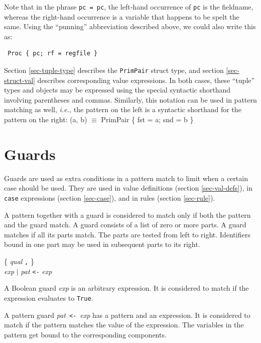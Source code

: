 \documentclass[twoside,letterpaper]{article}
\newcommand{\hm}{\hspace*{1em}}
\newcommand{\hmm}{\hspace*{2em}}
\newcommand{\ie}{\emph{i.e.,}}
\newcommand{\te}[1]{\texttt{#1}}
\newcommand{\nterm}[1]{\emph{#1}}
\newcommand{\term}[1]{{\tt{#1}}}
\newcommand{\many}[1]{\{ #1 \}}
\newcommand{\alt}{{$\mid$}}
\newcommand{\gram}[2]{    \hm\makebox[10em][l]{\it #1}\makebox[1.5em][l]{::=}    #2}
\begin{document}
Note that in the phrase {\mbox{\te{pc = pc}}}, the left-hand
occurrence of {\te{pc}} is the fieldname, whereas the right-hand
occurrence is a variable that happens to be spelt the same.  Using the
``punning'' abbreviation described above, we could also write this as:
\begin{verbatim}
 Proc { pc; rf = regfile }
\end{verbatim}

Section {\ref{sec-tuple-type}} describes the {\te{PrimPair}} struct
type, and section {\ref{sec-struct-val}} describes corresponding value
expressions.  In both cases, these ``tuple'' types and objects may be
expressed using the special syntactic shorthand involving parentheses
and commas.  Similarly, this notation can be used in pattern matching
as well, {\ie}
the pattern on the left is a syntactic shorthand for the pattern on
the right:
\BBS
(a, b)  \hmm  $\equiv$  \hmm  PrimPair \{ fst = a; snd = b \}
\EBS



\section{Guards}

\label{sec-guards}

Guards are used as extra conditions in a pattern match to limit when a
certain case should be used.  They are used in value definitions
(section {\ref{sec-val-defs}}), in {\te{case}} expressions (section
{\ref{sec-case}}), and in rules (section {\ref{sec-rule}}).

A pattern together with a guard is considered to match only if both
the pattern and the guard match.  A guard consists of a list of zero
or more parts.  A guard matches if all its parts match.  The parts are
tested from left to right.  Identifiers bound in one part may be used
in subsequent parts to its right.

\gram{guard}{\many{\nterm{qual} \term{,}}} \\
\gram{qual}{\nterm{exp} {\alt} {\nterm{pat} \term{<-} \nterm{exp}}}
\index{=ltminus@\te{<-} (in guards)}

A Boolean guard {\nterm{exp}} is an arbitrary expression.  It is
considered to match if the expression evaluates to \te{True}.

A pattern guard {\mbox{\nterm{pat} \term{<-} \nterm{exp}}} has a
pattern and an expression.  It is considered to match if the pattern
matches the value of the expression.  The variables in the pattern get
bound to the corresponding components.
\end{document}
